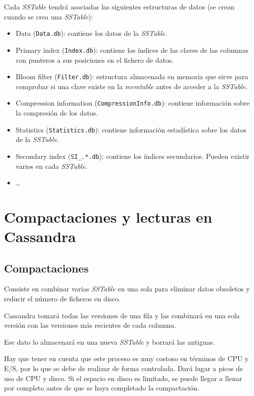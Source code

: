 \documentclass[
]{book}
\providecommand{\tightlist}{%
  \setlength{\itemsep}{0pt}\setlength{\parskip}{0pt}}
\begin{document}
Cada \emph{SSTable} tendrá asociadas las siguientes estructuras de datos (se crean cuando se crea una \emph{SSTable}):

\begin{itemize}
\tightlist
\item
  Data (\texttt{Data.db}): contiene los datos de la \emph{SSTable}.
\item
  Primary index (\texttt{Index.db}): contiene los índices de las claves de las columnas con punteros a sus posiciones en el fichero de datos.
\item
  Bloom filter (\texttt{Filter.db}): estructura almacenada en memoria que sirve para comprobar si una clave existe en la \emph{memtable} antes de acceder a la \emph{SSTable}.
\item
  Compression information (\texttt{CompressionInfo.db}): contiene información sobre la compresión de los datos.
\item
  Statistics (\texttt{Statistics.db}): contiene información estadística sobre los datos de la \emph{SSTable}.
\item
  Secondary index (\texttt{SI\_.*.db}): contiene los índices secundarios. Pueden existir varios en cada \emph{SSTable}.
\item
  \ldots{}
\end{itemize}

\section{Compactaciones y lecturas en Cassandra}\label{compactaciones-y-lecturas-en-cassandra}

\subsection{Compactaciones}\label{compactaciones}

Consiste en combinar varias \emph{SSTable} en una sola para eliminar datos obsoletos y reducir el número de ficheros en disco.

Cassandra tomará todas las versiones de una fila y las combinará en una sola versión con las versiones más recientes de cada columna.

Ese dato lo almacenará en una nueva \emph{SSTable} y borrará las antiguas.

Hay que tener en cuenta que este proceso es muy costoso en términos de CPU y E/S, por lo que se debe de realizar de forma controlada. Dará lugar a picos de uso de CPU y disco. Si el espacio en disco es limitado, se puede llegar a llenar por completo antes de que se haya completado la compactación.
\end{document}
